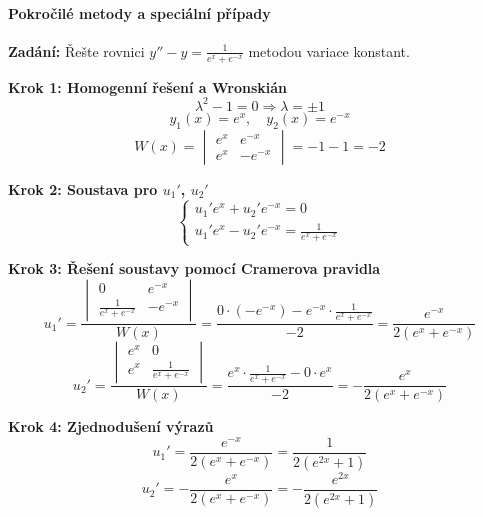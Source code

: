 \paragraph{Pokročilé metody a speciální případy}

\begin{example}
\label{ex:variace-konstant-wronskian}

\noindent\textbf{Zadání:} Řešte rovnici $y'' - y = \frac{1}{e^x + e^{-x}}$ metodou variace konstant.

\vspace{1.5\baselineskip}

\noindent\textbf{Krok 1: Homogenní řešení a Wronskián}
\[
\lambda^2 - 1 = 0 \Rightarrow \lambda = \pm 1
\]
\[
y_1(x) = e^{x}, \quad y_2(x) = e^{-x}
\]
\[
W(x) = \begin{vmatrix}
e^{x} & e^{-x} \\
e^{x} & -e^{-x}
\end{vmatrix} = -1 - 1 = -2
\]

\vspace{1\baselineskip}

\noindent\textbf{Krok 2: Soustava pro $u_1'$, $u_2'$}
\[
\begin{cases}
u_1'e^{x} + u_2'e^{-x} = 0 \\
u_1'e^{x} - u_2'e^{-x} = \frac{1}{e^x + e^{-x}}
\end{cases}
\]

\vspace{1\baselineskip}

\noindent\textbf{Krok 3: Řešení soustavy pomocí Cramerova pravidla}
\[
u_1' = \frac{
\begin{vmatrix}
0 & e^{-x} \\
\frac{1}{e^x + e^{-x}} & -e^{-x}
\end{vmatrix}}{W(x)} = \frac{0 \cdot (-e^{-x}) - e^{-x} \cdot \frac{1}{e^x + e^{-x}}}{-2} = \frac{e^{-x}}{2(e^x + e^{-x})}
\]
\[
u_2' = \frac{
\begin{vmatrix}
e^{x} & 0 \\
e^{x} & \frac{1}{e^x + e^{-x}}
\end{vmatrix}}{W(x)} = \frac{e^{x} \cdot \frac{1}{e^x + e^{-x}} - 0 \cdot e^{x}}{-2} = -\frac{e^{x}}{2(e^x + e^{-x})}
\]

\vspace{1\baselineskip}

\noindent\textbf{Krok 4: Zjednodušení výrazů}
\[
u_1' = \frac{e^{-x}}{2(e^x + e^{-x})} = \frac{1}{2(e^{2x} + 1)}
\]
\[
u_2' = -\frac{e^{x}}{2(e^x + e^{-x})} = -\frac{e^{2x}}{2(e^{2x} + 1)}
\]


\end{example}
